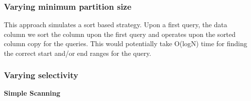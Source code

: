 \subsubsection{Varying minimum partition size}


This approach simulates a sort based strategy. Upon a first query, the data column we sort the column upon the first query and operates upon the sorted column copy for the queries. This would potentially take O(logN) time for finding the correct start and/or end ranges for the query.

\subsubsection{Varying selectivity}

\textbf{Simple Scanning}
\label{sec:experiments}

